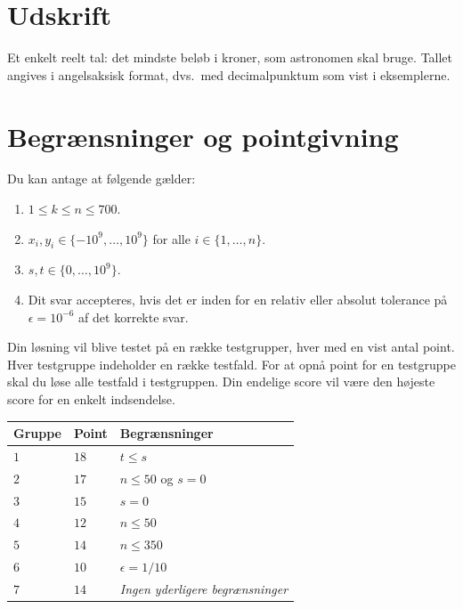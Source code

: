 \section*{Udskrift}

Et enkelt reelt tal: det mindste beløb i kroner, som astronomen skal bruge.
Tallet angives i angelsaksisk format, dvs.\ med decimalpunktum som vist i eksemplerne.

\section*{Begrænsninger og pointgivning}

Du kan antage at følgende gælder:
\begin{enumerate}
\item $1\leq k\leq n\leq 700$. %
\item $x_i, y_i\in \{-10^9,\ldots, 10^9\}$ for alle $i\in\{1,\ldots,n\}$. %
\item $s,t\in \{0,\ldots, 10^9\}$. %
\item Dit svar accepteres, hvis det er inden for en relativ eller absolut tolerance på $\epsilon = 10^{-6}$ af det korrekte svar.
\end{enumerate}

Din løsning vil blive testet på en række testgrupper, hver med en vist antal point.
Hver testgruppe indeholder en række testfald.
For at opnå point for en testgruppe skal du løse alle testfald i testgruppen.
Din endelige score vil være den højeste score for en enkelt indsendelse.

\medskip
\noindent
\begin{tabular}{lll}
Gruppe & Point & Begrænsninger\\\hline
$1$ & $18$ & $t\leq s$\\
$2$ & $17$ & $n\leq 50$ og $s=0$\\
$3$ & $15$ & $s=0$\\
$4$ & $12$ & $n\leq 50$\\
$5$ & $14$ & $n\leq 350$\\
$6$ & $10$ & $\epsilon = 1/10$\\
$7$ & $14$ & \emph{Ingen yderligere begrænsninger}
\end{tabular}
